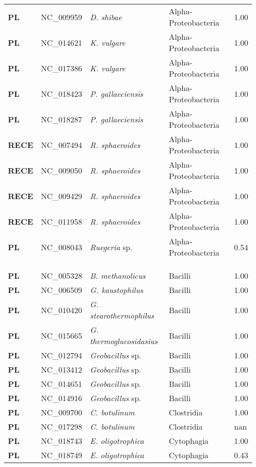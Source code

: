 \begin{adjustwidth}{-3cm}{2cm}
{\begin{supertabular}{>{\bfseries}l|p{0.1\textwidth}p{0.14\textwidth}l|l}
PL & NC\_009959 & \textit{D. shibae} & Alpha-Proteobacteria & 1.00\\
PL & NC\_014621 & \textit{K. vulgare} & Alpha-Proteobacteria & 1.00\\
PL & NC\_017386 & \textit{K. vulgare} & Alpha-Proteobacteria & 1.00\\
PL & NC\_018423 & \textit{P. gallaeciensis} & Alpha-Proteobacteria & 1.00\\
PL & NC\_018287 & \textit{P. gallaeciensis} & Alpha-Proteobacteria & 1.00\\
RECE & NC\_007494 & \textit{R. sphaeroides} & Alpha-Proteobacteria & 1.00\\
RECE & NC\_009050 & \textit{R. sphaeroides} & Alpha-Proteobacteria & 1.00\\
RECE & NC\_009429 & \textit{R. sphaeroides} & Alpha-Proteobacteria & 1.00\\
RECE & NC\_011958 & \textit{R. sphaeroides} & Alpha-Proteobacteria & 1.00\\
PL & NC\_008043 & \textit{Ruegeria} sp. & Alpha-Proteobacteria & 0.54\\
\\
\\
\hline\\
PL & NC\_005328 & \textit{B. methanolicus} & Bacilli & 1.00\\
PL & NC\_006509 & \textit{G. kaustophilus} & Bacilli & 1.00\\
PL & NC\_010420 & \textit{G. stearothermophilus} & Bacilli & 1.00\\
PL & NC\_015665 & \textit{G. thermoglucosidasius} & Bacilli & 1.00\\
PL & NC\_012794 & \textit{Geobacillus} sp. & Bacilli & 1.00\\
PL & NC\_013412 & \textit{Geobacillus} sp. & Bacilli & 1.00\\
PL & NC\_014651 & \textit{Geobacillus} sp. & Bacilli & 1.00\\
PL & NC\_014916 & \textit{Geobacillus} sp. & Bacilli & 1.00\\
PL & NC\_009700 & \textit{C. botulinum} & Clostridia & 1.00\\
PL & NC\_017298 & \textit{C. botulinum} & Clostridia & nan\\
PL & NC\_018743 & \textit{E. oligotrophica} & Cytophagia & 1.00\\
PL & NC\_018749 & \textit{E. oligotrophica} & Cytophagia & 0.43\\

\end{supertabular}}
\end{adjustwidth}
